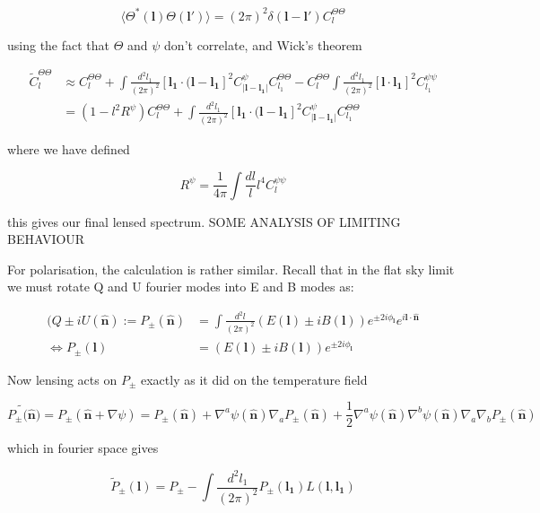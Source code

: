 \documentclass[a4paper,11pt]{article}
\renewcommand{\v}[1]{\mathbf{#1}}
\newcommand{\half}{\frac{1}{2}}
\newcommand{\finttwo}[1]{\int \frac{d^2 #1}{(2\pi)^2}}
\newcommand{\unit}[1]{\hat{\v{#1}}}
\begin{document}
\begin{equation}
\langle \Theta^*(\v{l})\Theta(\v{l}')\rangle = (2\pi)^2\delta(\v{l}-\v{l}')C_l^{\Theta\Theta}
\end{equation}

using the fact that $\Theta$ and $\psi$ don't correlate, and Wick's theorem

\begin{align}
\tilde{C}_l^{\Theta \Theta} &\approx C_l^{\Theta \Theta}+\finttwo{l_1}[ \v{l_1}\cdot(\v{l}-\v{l_1}]^2 C^\psi_{|\v{l}-\v{l_1}|}C_{l_1}^{\Theta\Theta} - C_l^{\Theta\Theta}\finttwo{l_1} [\v{l}\cdot\v{l_1}]^2C_{l_1}^{\psi\psi}\\
&=(1-l^2R^\psi)C_l^{\Theta\Theta}+\finttwo{l_1}[ \v{l_1}\cdot(\v{l}-\v{l_1}]^2 C^{\psi}_{|\v{l}-\v{l_1}|}C_{l_1}^{\Theta\Theta}
\end{align}

where we have defined

\begin{equation}
R^\psi = \frac{1}{4\pi}\int \frac{dl}{l} l^4 C_l^{\psi\psi}
\end{equation}

this gives our final lensed spectrum. SOME ANALYSIS OF LIMITING BEHAVIOUR

For polarisation, the calculation is rather similar. Recall that in the flat sky limit we must rotate Q and U fourier modes into E and B modes as:

\begin{align}
(Q\pm iU(\unit{n}) := P_{\pm} (\unit{n}) &= \finttwo{l}(E(\v{l})\pm i B(\v{l}))e^{\pm 2i\phi_{\v{l}}}e^{i\v{l}\cdot\unit{n}}\\
\Leftrightarrow  P_{\pm}(\v{l}) &= (E(\v{l})\pm i B(\v{l}))e^{\pm 2i\phi_{\v{l}}}
\label{relationship}
\end{align}

Now lensing acts on $P_{\pm}$ exactly as it did on the temperature field 

\begin{equation}
\tilde{P_{\pm}(\unit{n}}) = P_{\pm}(\unit{n}+\nabla\psi) =P_{\pm}(\unit{n})+\nabla^a\psi(\unit{n})\nabla_aP_{\pm}(\unit{n})+\half\nabla^a\psi(\unit{n})\nabla^b\psi(\unit{n})\nabla_a\nabla_bP_{\pm}(\unit{n})
\end{equation}

which in fourier space gives

\begin{equation}
\tilde{P}_{\pm}(\v{l}) = P_{\pm} - \finttwo{l_1} P_{\pm}(\v{l_1})L(\v{l},\v{l_1})
\end{equation}
\end{document}

